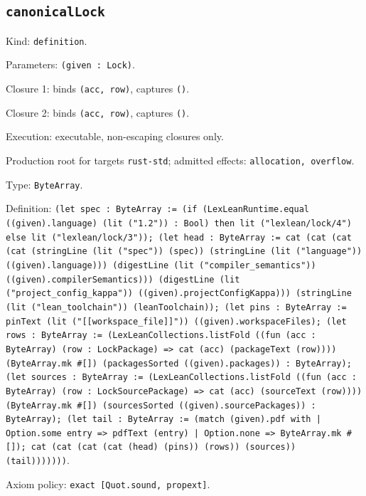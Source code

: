 \documentclass[11pt]{article}
\begin{document}
\subsection*{\texttt{canonicalLock}}
\noindent Kind: \texttt{definition}.\par
\noindent Parameters: \texttt{(given : Lock)}.\par
\noindent Closure 1: binds \texttt{(acc, row)}, captures \texttt{()}.\par
\noindent Closure 2: binds \texttt{(acc, row)}, captures \texttt{()}.\par
\noindent Execution: executable, non-escaping closures only.\par
\noindent Production root for targets \texttt{rust-std}; admitted effects: \texttt{allocation, overflow}.\par
\noindent Type: \texttt{ByteArray}.\par
\noindent Definition: \texttt{(let spec : ByteArray := (if (LexLeanRuntime.equal ((given).language) (lit ("1.2")) : Bool) then lit ("lexlean/lock/4") else lit ("lexlean/lock/3")); (let head : ByteArray := cat (cat (cat (cat (stringLine (lit ("spec")) (spec)) (stringLine (lit ("language")) ((given).language))) (digestLine (lit ("compiler\_semantics")) ((given).compilerSemantics))) (digestLine (lit ("project\_config\_kappa")) ((given).projectConfigKappa))) (stringLine (lit ("lean\_toolchain")) (leanToolchain)); (let pins : ByteArray := pinText (lit ("[[workspace\_file]]")) ((given).workspaceFiles); (let rows : ByteArray := (LexLeanCollections.listFold ((fun (acc : ByteArray) (row : LockPackage) => cat (acc) (packageText (row)))) (ByteArray.mk \#[]) (packagesSorted ((given).packages)) : ByteArray); (let sources : ByteArray := (LexLeanCollections.listFold ((fun (acc : ByteArray) (row : LockSourcePackage) => cat (acc) (sourceText (row)))) (ByteArray.mk \#[]) (sourcesSorted ((given).sourcePackages)) : ByteArray); (let tail : ByteArray := (match (given).pdf with | Option.some entry => pdfText (entry) | Option.none => ByteArray.mk \#[]); cat (cat (cat (cat (head) (pins)) (rows)) (sources)) (tail)))))))}.\par
\noindent Axiom policy: \texttt{exact [Quot.sound, propext]}.\par
\end{document}
